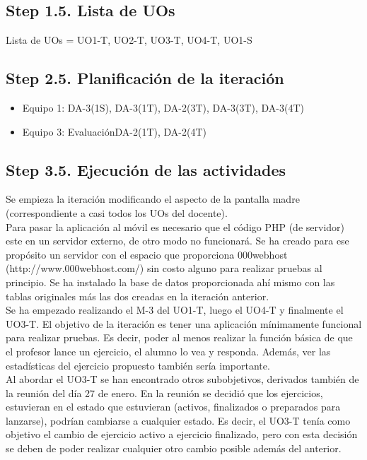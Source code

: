 \subsection{Step 1.5. Lista de UOs}
\label{it5:1.5}

Lista de UOs = {UO1-T, UO2-T, UO3-T, UO4-T, UO1-S}

\subsection{Step 2.5. Planificación de la iteración}
\label{it5:2.5}

\begin{itemize}
\item Equipo 1: DA-3(1S), DA-3(1T), DA-2(3T), DA-3(3T), DA-3(4T)   
\item Equipo 3: Evaluación{DA-2(1T), DA-2(4T)}
\end{itemize}

\subsection{Step 3.5. Ejecución de las actividades}
\label{it5:3.5}

Se empieza la iteración modificando el aspecto de la pantalla madre (correspondiente a casi todos los UOs del docente).\\

Para pasar la aplicación al móvil es necesario que el código PHP (de servidor) este en un servidor externo, de otro modo no funcionará. Se ha creado para ese propósito un servidor con el espacio que proporciona 000webhost (http://www.000webhost.com/) sin costo alguno para realizar pruebas al principio. Se ha instalado la base de datos proporcionada ahí mismo con las tablas originales más las dos creadas en la iteración anterior.\\

Se ha empezado realizando el M-3 del UO1-T, luego el UO4-T y finalmente el UO3-T. El objetivo de la iteración es tener una aplicación mínimamente funcional para realizar pruebas. Es decir, poder al menos realizar la función básica de que el profesor lance un ejercicio, el alumno lo vea y responda. Además, ver las estadísticas del ejercicio propuesto también sería importante.\\

Al abordar el UO3-T se han encontrado otros subobjetivos, derivados también de la reunión del día 27 de enero. En la reunión se decidió que los ejercicios, estuvieran en el estado que estuvieran (activos, finalizados o preparados para lanzarse), podrían cambiarse a cualquier estado. Es decir, el UO3-T tenía como objetivo el cambio de ejercicio activo a ejercicio finalizado, pero con esta decisión se deben de poder realizar cualquier otro cambio posible además del anterior.\\

